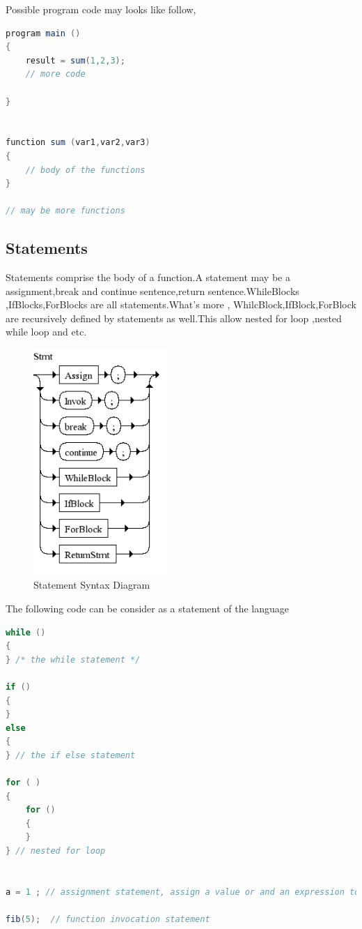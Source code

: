 Possible program code may looks like follow,

\begin{lstlisting}[language=java]
program main ()
{
 	result = sum(1,2,3);
 	// more code
 	
}


function sum (var1,var2,var3)
{
	// body of the functions
}

// may be more functions
\end{lstlisting}


\subsection{Statements}
Statements  comprise the body of a function.A statement may be a assignment,break and continue sentence,return sentence.WhileBlocks ,IfBlocks,ForBlocks are all statements.What's more , WhilcBlock,IfBlock,ForBlock are recursively defined by statements as well.This allow nested for loop ,nested while loop and etc.

\begin{figure}[h!]
  \centering
	\includegraphics[width=0.45\textwidth]{pic/c4/stmt.png}
	\caption{Statement Syntax Diagram}
\end{figure}

The following code can be consider as a statement of the language
\begin{lstlisting}[language=java]
while ()
{
} /* the while statement */

if ()
{
}
else
{
} // the if else statement

for ( )
{
	for ()
	{
	}
} // nested for loop 


a = 1 ; // assignment statement, assign a value or and an expression to a variable

fib(5);  // function invocation statement


\end{lstlisting}

